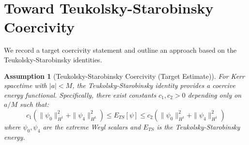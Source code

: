 \documentclass[12pt,a4paper]{article}
\newtheorem{assumption}[theorem]{Assumption}
\begin{document}
\section{Toward Teukolsky-Starobinsky Coercivity}

We record a target coercivity statement and outline an approach based on the Teukolsky-Starobinsky identities.

\begin{assumption}[Teukolsky-Starobinsky Coercivity (Target Estimate)]\label{thm:TS-rigorous}
For Kerr spacetime with $|a| < M$, the Teukolsky-Starobinsky identity provides a coercive energy functional. Specifically, there exist constants $c_1, c_2 > 0$ depending only on $a/M$ such that:
\begin{equation}
c_1 \left(\|\psi_0\|^2_{H^1} + \|\psi_4\|^2_{H^1}\right) \leq E_{TS}[\psi] \leq c_2 \left(\|\psi_0\|^2_{H^1} + \|\psi_4\|^2_{H^1}\right)
\end{equation}
where $\psi_0, \psi_4$ are the extreme Weyl scalars and $E_{TS}$ is the Teukolsky-Starobinsky energy.
\end{assumption}
\end{document}
